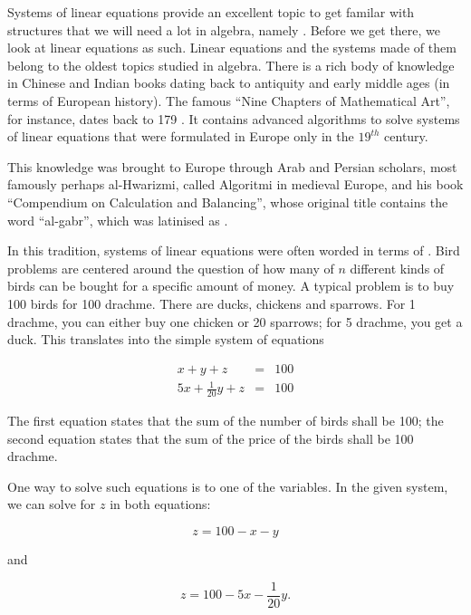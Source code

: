 \documentclass[tikz]{scrreprt}
\begin{document}
Systems of linear equations provide an excellent topic
to get familar with structures that we will need a lot
in algebra, namely . Before we get there,
we look at linear equations as such. Linear equations
and the systems made of them belong to the oldest topics
studied in algebra. There is a rich body of knowledge in
Chinese and Indian books dating back to antiquity and
early middle ages (in terms of European history). The
famous ``Nine Chapters of Mathematical Art'', for instance,
dates back to 179 . It contains advanced
algorithms to solve systems of linear equations that were
formulated in Europe only in the $19^{th}$ century.

This knowledge was brought to Europe through Arab and
Persian scholars, most famously perhaps al-Hwarizmi,
called Algoritmi in medieval Europe, 
and his book ``Compendium on Calculation and Balancing'',
whose original title contains the word ``al-gabr'',
which was latinised as .

In this tradition, systems of linear equations were
often worded in terms of .
Bird problems are centered around the question of
how many of $n$ different kinds of birds can be
bought for a specific amount of money. A typical
problem is to buy 100 birds for 100 drachme.
There are ducks, chickens and sparrows. 
For 1 drachme, you can either buy one chicken
or 20 sparrows; for 5 drachme, you get a duck.
This translates into the simple
system of equations

\begin{equation}
\begin{array}{lcl}
x + y + z & = & 100\\
5x + \frac{1}{20}y + z & = & 100
\end{array}
\end{equation}

The first equation states that the sum of the number of birds
shall be 100; the second equation states that the sum of the
price of the birds shall be 100 drachme.

One way to solve such equations is 
to  one of the variables.
In the given system, we can solve for $z$
in both equations:

\begin{equation}
z = 100 - x - y
\end{equation}

and

\begin{equation}
z = 100 - 5x - \frac{1}{20}y.
\end{equation}
\end{document}
